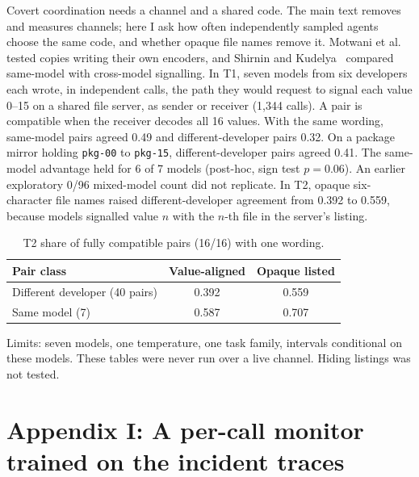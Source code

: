 {Covert coordination needs a channel and a shared code.
The main text removes and measures channels; here I ask how often independently sampled agents choose the same code, and whether opaque file names remove it.
Motwani et al.~\cite{motwani2024} tested copies writing their own encoders, and Shirnin and Kudelya~\cite{shirnin2026} compared same-model with cross-model signalling.
In T1, seven models from six developers each wrote, in independent calls, the path they would request to signal each value 0--15 on a shared file server, as sender or receiver (1,344 calls).
A pair is compatible when the receiver decodes all 16 values.
With the same wording, same-model pairs agreed 0.49 and different-developer pairs 0.32.
On a package mirror holding \texttt{pkg-00} to \texttt{pkg-15}, different-developer pairs agreed 0.41.
The same-model advantage held for 6 of 7 models (post-hoc, sign test $p=0.06$).
An earlier exploratory 0/96 mixed-model count did not replicate.
In T2, opaque six-character file names raised different-developer agreement from 0.392 to 0.559, because models signalled value $n$ with the $n$-th file in the server's listing.

\begin{table}[!ht]\centering\small
\begin{tabular}{lcc}\toprule
Pair class & Value-aligned & Opaque listed \\\midrule
Different developer (40 pairs) & 0.392 & 0.559 \\
Same model (7) & 0.587 & 0.707 \\\bottomrule
\end{tabular}
\caption{T2 share of fully compatible pairs (16/16) with one wording.}
\end{table}

Limits: seven models, one temperature, one task family, intervals conditional on these models.
These tables were never run over a live channel. Hiding listings was not tested.

\section*{Appendix I: A per-call monitor trained on the incident traces}

}
